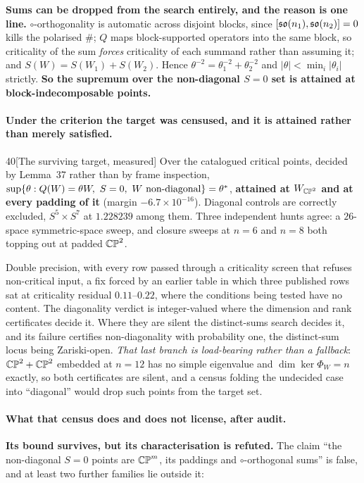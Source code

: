\textbf{Sums can be dropped from the search entirely, and the reason is one line.} $\circ$-orthogonality is automatic across disjoint blocks, since $[\mathfrak{so}(n_1),\mathfrak{so}(n_2)]=0$ kills the polarised $\#$; $Q$ maps block-supported operators into the same block, so criticality of the sum \emph{forces} criticality of each summand rather than assuming it; and $S(W)=S(W_1)+S(W_2)$. Hence $\theta^{-2}=\theta_1^{-2}+\theta_2^{-2}$ and $|\theta|<\min_i|\theta_i|$ strictly. \textbf{So the supremum over the non-diagonal $S=0$ set is attained at block-indecomposable points.}

\paragraph{Under the criterion the target was censused, and it is attained rather than merely satisfied.}

\begin{Obs}{40}[The surviving target, measured]
Over the catalogued critical points, decided by Lemma~37 rather than by frame inspection, $\sup\{\theta:Q(W)=\theta W,\ S=0,\ W\text{ non-diagonal}\}=\theta^{*}$, \textbf{attained at $W_{\mathbb{CP}^2}$ and at every padding of it} (margin $-6.7\times10^{-16}$). Diagonal controls are correctly excluded, $S^5\times S^7$ at $1.228239$ among them. Three independent hunts agree: a $26$-space symmetric-space sweep, and closure sweeps at $n=6$ and $n=8$ both topping out at padded $\mathbb{CP}^2$.
\end{Obs}

\begin{certificate}
Double precision, with every row passed through a criticality screen that refuses non-critical input, a fix forced by an earlier table in which three published rows sat at criticality residual $0.11$--$0.22$, where the conditions being tested have no content. The diagonality verdict is integer-valued where the dimension and rank certificates decide it. Where they are silent the distinct-sums search decides it, and its failure certifies non-diagonality with probability one, the distinct-sum locus being Zariski-open. \emph{That last branch is load-bearing rather than a fallback}: $\mathbb{CP}^2+\mathbb{CP}^2$ embedded at $n=12$ has no simple eigenvalue and $\dim\ker\Phi_W=n$ exactly, so both certificates are silent, and a census folding the undecided case into ``diagonal'' would drop such points from the target set.
\end{certificate}

\paragraph{What that census does and does not license, after audit.} \textbf{Its bound survives, but its characterisation is refuted.} The claim ``the non-diagonal $S=0$ points are $\mathbb{CP}^m$, its paddings and $\circ$-orthogonal sums'' is false, and at least two further families lie outside it:

